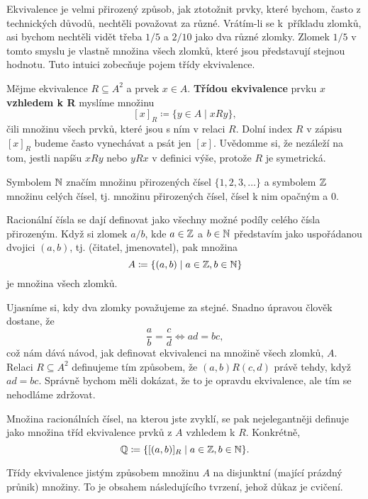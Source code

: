 Ekvivalence je velmi přirozený způsob, jak ztotožnit prvky, které bychom, často
z technických důvodů, nechtěli považovat za různé. Vrátím-li se k~příkladu
zlomků, asi bychom nechtěli vidět třeba $1 / 5$ a $2 / 10$ jako dva různé
zlomky. Zlomek $1 / 5$ v tomto smyslu je vlastně množina všech zlomků, které
jsou představují stejnou hodnotu. Tuto intuici zobecňuje pojem třídy
ekvivalence.

\begin{definition}
 Mějme ekvivalence $R \subseteq A^2$ a prvek $x \in A$. \textbf{Třídou
 ekvivalence} prvku $x$ \textbf{vzhledem k R} myslíme množinu
 \[
  [x]_{R} \coloneqq \{y \in A \mid xRy\},
 \]
 čili množinu všech prvků, které jsou s ním v relaci $R$. Dolní index $R$ v
 zápisu $[x]_R$ budeme často vynechávat a psát jen $[x]$. Uvědomme si, že
 nezáleží na tom, jestli napíšu $xRy$ nebo $yRx$ v definici výše, protože $R$ je
 symetrická.
\end{definition}

\begin{example}
 Symbolem $\mathbb{N}$ značím množinu přirozených čísel $\{1,2,3,\ldots\}$ a symbolem
 $\mathbb{Z}$ množinu celých čísel, tj. množinu přirozených čísel, čísel k nim opačným a
 $0$.

 Racionální čísla se dají definovat jako všechny možné podíly celého čísla
 přirozeným. Když si zlomek $a / b$, kde  $a \in \mathbb{Z}$ a $b \in \mathbb{N}$ představím
 jako uspořádanou dvojici $(a,b)$, tj. (čitatel, jmenovatel), pak množina
 \[
  A \coloneqq \{(a,b) \mid a \in \mathbb{Z}, b \in \mathbb{N}\}
 \]
 je množina všech zlomků.

 Ujasníme si, kdy dva zlomky považujeme za stejné. Snadno úpravou člověk
 dostane, že
 \[
  \frac{a}{b} = \frac{c}{d} \iff ad = bc,
 \]
 což nám dává návod, jak definovat ekvivalenci na množině všech zlom\-ků, $A$.
 Relaci $R \subseteq A^2$ definujeme tím způsobem, že $(a,b)R(c,d)$ právě tehdy,
 když $ad = bc$. Správně bychom měli dokázat, že to je opravdu ekvivalence, ale
 tím se nehodláme zdržovat.

 Množina racionálních čísel, na kterou jste zvyklí, se pak nejelegantněji
 definuje jako množina tříd ekvivalence prvků z $A$ vzhledem k $R$. Konkrétně,
 \[
  \mathbb{Q} \coloneqq \{[(a, b)]_R \mid a \in \mathbb{Z},b \in \mathbb{N}\}.
 \]
\end{example}

Třídy ekvivalence jistým způsobem  množinu $A$ na disjunktní
(mající prázdný průnik) množiny. To je obsahem následujícího tvrzení, jehož
důkaz je cvičení.

